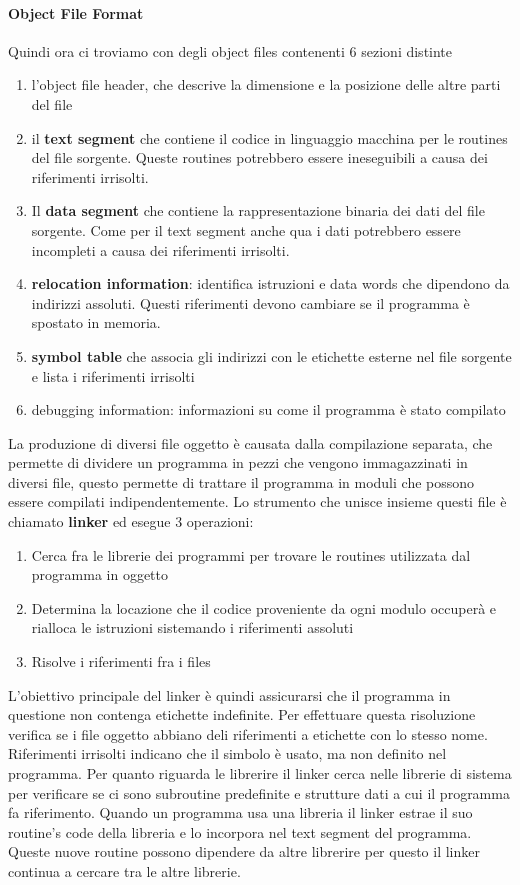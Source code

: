 \documentclass[12pt, a4paper, openany]{book}
\begin{document}
\paragraph*{Object File Format} Quindi ora ci troviamo con degli object files contenenti 6
sezioni distinte
\begin{enumerate}
    \item l'object file header, che descrive la dimensione e la posizione delle altre parti del file
    \item il \textbf{text segment} che contiene il codice in linguaggio macchina per le routines
    del file sorgente. Queste routines potrebbero essere ineseguibili a causa dei riferimenti irrisolti.
    \item Il \textbf{data segment} che contiene la rappresentazione binaria dei dati del file sorgente.
    Come per il text segment anche qua i dati potrebbero essere incompleti a causa dei riferimenti irrisolti.
    \item \textbf{relocation information}: identifica istruzioni e data words che dipendono
    da indirizzi assoluti. Questi riferimenti devono cambiare se il programma è spostato in memoria.
    \item \textbf{symbol table} che associa gli indirizzi con le etichette esterne nel file sorgente e lista
    i riferimenti irrisolti
    \item debugging information: informazioni su come il programma è stato compilato
\end{enumerate}
La produzione di diversi file oggetto è causata dalla compilazione separata, che permette di
dividere un programma in pezzi che vengono immagazzinati in diversi file, questo permette
di trattare il programma in moduli che possono essere compilati indipendentemente.
Lo strumento che unisce insieme questi file è chiamato \textbf{linker} ed esegue 3 operazioni:
\begin{enumerate}
    \item Cerca fra le librerie dei programmi per trovare le routines utilizzata dal programma in oggetto
    \item Determina la locazione che il codice proveniente da ogni modulo occuperà e rialloca le istruzioni
    sistemando i riferimenti assoluti
    \item Risolve i riferimenti fra i files
\end{enumerate}
L'obiettivo principale del linker è quindi assicurarsi che il programma in questione non contenga 
etichette indefinite. Per effettuare questa risoluzione verifica se i file oggetto abbiano
deli riferimenti a etichette con lo stesso nome. Riferimenti irrisolti indicano che il simbolo è 
usato, ma non definito nel programma.
Per quanto riguarda le librerire il linker cerca nelle librerie di sistema per verificare se ci sono
subroutine predefinite e strutture dati a cui il programma fa riferimento.
Quando un programma usa una libreria il linker estrae il suo routine's code della libreria
e lo incorpora nel text segment del programma. Queste nuove routine possono dipendere da altre librerire per questo il linker
continua a cercare tra le altre librerie.
\end{document}
